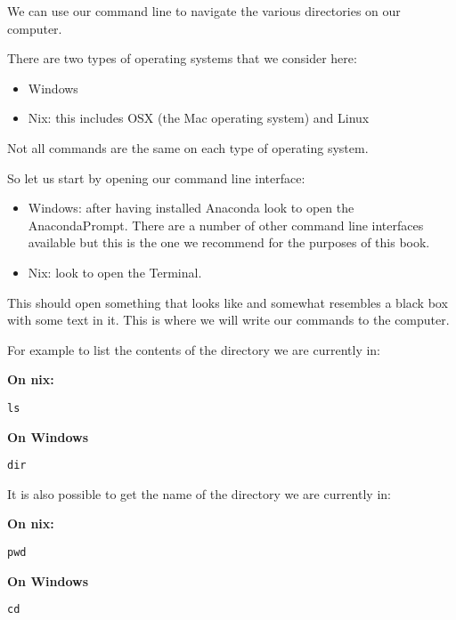 
We can use our command line to navigate the various directories on our
computer.

There are two types of operating systems that we consider here:

\begin{itemize}
    \item Windows
    \item Nix: this includes OSX (the Mac operating system) and Linux
\end{itemize}

Not all commands are the same on each type of operating system.

So let us start by opening our command line interface:

\begin{itemize}
    \item Windows: after having installed Anaconda look to open the
        AnacondaPrompt. There are a number of other command line interfaces
        available but this is the one we recommend for the purposes of this
        book.
    \item Nix: look to open the Terminal.
\end{itemize}

This should open something that looks like %
and somewhat resembles a black box with some text in it.
This is where we will write our commands to the computer.

For example to list the contents of the directory we are currently in:

\textbf{On nix:}

\begin{verbatim}
ls
\end{verbatim}

\textbf{On Windows}

\begin{verbatim}
dir
\end{verbatim}

It is also possible to get the name of the directory we are currently in:

\textbf{On nix:}

\begin{verbatim}
pwd
\end{verbatim}

\textbf{On Windows}

\begin{verbatim}
cd
\end{verbatim}

